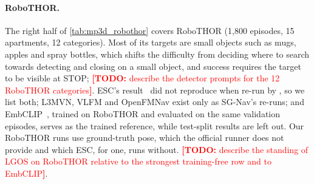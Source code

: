 \documentclass[10pt]{article}
\newcommand{\TODO}[1]{\textcolor{red}{\textbf{[TODO:} #1\textbf{]}}}
\newcommand{\ours}{LGOS\xspace}
\begin{document}
\paragraph{RoboTHOR.}
The right half of \cref{tab:mp3d_robothor} covers RoboTHOR (1{,}800 episodes, 15 apartments, 12 categories). Most of
its targets are small objects such as mugs, apples and spray bottles, which shifts the difficulty from deciding where
to search towards detecting and closing on a small object, and success requires the target to be visible at STOP;
\TODO{describe the detector prompts for the 12 RoboTHOR categories}. ESC's result~\citep{zhou2023esc} did not
reproduce when re-run by \citet{unlu2024reproducibility}, so we list both; L3MVN, VLFM and OpenFMNav exist
only as SG-Nav's re-runs; and EmbCLIP~\citep{khandelwal2022simple}, trained on RoboTHOR and evaluated on the same
validation episodes, serves as the trained reference, while test-split results are left out. Our RoboTHOR runs use
ground-truth pose, which the official runner does not provide and which ESC, for one, runs without.
\TODO{describe the standing of \ours on RoboTHOR relative to the strongest training-free row and to EmbCLIP}.
\end{document}
